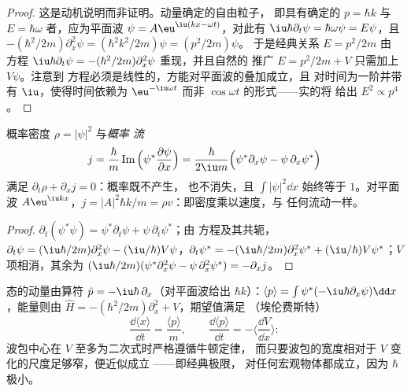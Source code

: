 \begin{proof}
这是动机说明而非证明。动量确定的自由粒子，
即具有确定的 $p = \hbar k$ 与 $E = \hbar\omega$ 者，应为平面波 $\psi =
A\eu^{\iu(kx - \omega t)}$，对此有 $\iu\hbar\partial_t\psi = \hbar\omega\psi =
E\psi$，且 $-(\hbar^2/2m)\partial_x^2\psi = (\hbar^2k^2/2m)\psi = (p^2/2m)\psi$。
于是经典关系 $E = p^2/2m$ 由
方程 $\iu\hbar\partial_t\psi = -(\hbar^2/2m)\partial_x^2\psi$ 重现，并且自然的
推广 $E = p^2/2m + V$ 只需加上 $V\psi$。注意到
方程必须是线性的，方能对平面波的叠加成立，且
对时间为一阶并带有 $\iu$，使得时间依赖为 $\eu^{-\iu\omega t}$ 而非
$\cos\omega t$ 的形式——实的将
给出 $E^2 \propto p^4$。
\end{proof}

\begin{proposition}[概率守恒]\label{prop:b2:schrodinger-wave-functions:current}
概率密度 $\rho = |\psi|^2$ 与\emph{概率
流}
\[
j = \frac{\hbar}{m}\operatorname{Im}\Big(\psi^*\frac{\partial\psi}{\partial x}\Big)
= \frac{\hbar}{2\iu m}\Big(\psi^*\partial_x\psi - \psi\,\partial_x\psi^*\Big)
\]
满足 $\partial_t\rho + \partial_xj = 0$：概率既不产生，
也不消失，且 $\int|\psi|^2\dd x$ 始终等于 $1$。对平面波
$A\eu^{\iu kx}$，$j = |A|^2\hbar k/m = \rho v$：即密度乘以速度，与
任何流动一样。
\end{proposition}

\begin{proof}
$\partial_t(\psi^*\psi) = \psi^*\partial_t\psi + \psi\,\partial_t\psi^*$；由
方程及其共轭，$\partial_t\psi = (\iu\hbar/2m)\partial_x^2\psi -
(\iu/\hbar)V\psi$，$\partial_t\psi^* = -(\iu\hbar/2m)\partial_x^2\psi^* +
(\iu/\hbar)V\psi^*$；$V$ 项相消，其余为 $(\iu\hbar/2m)(\psi^*
\partial_x^2\psi - \psi\,\partial_x^2\psi^*) = -\partial_xj$。
\end{proof}

\begin{proposition}[动量、期望值与经典极限]\label{prop:b2:schrodinger-wave-functions:ehrenfest}
态的动量由算符 $\hat p =
-\iu\hbar\,\partial_x$（对平面波给出 $\hbar k$）：$\langle
p\rangle = \int\psi^*(-\iu\hbar\partial_x\psi)\dd x$，能量则由 $\hat H
= -(\hbar^2/2m)\partial_x^2 + V$，期望值满足
（埃伦费斯特）
\[
\frac{\dd\langle x\rangle}{\dd t} = \frac{\langle p\rangle}{m}, \qquad
\frac{\dd\langle p\rangle}{\dd t} = -\Big\langle\frac{\dd V}{\dd x}\Big\rangle :
\]
波包中心在 $V$ 至多为二次式时严格遵循牛顿定律，
而只要波包的宽度相对于 $V$ 变化的尺度足够窄，便近似成立
——即经典极限，
对任何宏观物体都成立，因为 $\hbar$ 极小。
\end{proposition}

